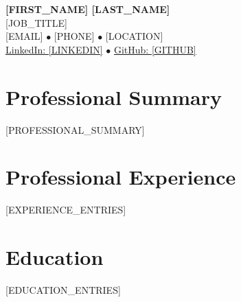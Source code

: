 \documentclass[10pt,letterpaper]{article}
\makeatletter
\newcommand{\ressubheading}[4]{
    \begin{tabular*}{6.5in}{l@{\cftdotfill{\cftsecdotsep}\extracolsep{\fill}}r}
        \textbf{#1} & #2 \\
        \textit{#3} & \textit{#4} \\
    \end{tabular*}\vspace{-6pt}
}
\newcommand{\resitem}[1]{\item #1 \vspace{-2pt}}
\newcommand{\resliststart}{\begin{itemize}[leftmargin=*,noitemsep,topsep=0pt]}
\newcommand{\reslistend}{\end{itemize}}
\makeatother
\begin{document}
\begin{center}
    {\Huge\bfseries\color{heading}[FIRST_NAME] [LAST_NAME]}\\
    \vspace{5pt}
    {\Large\color{subheading}[JOB_TITLE]}\\
    \vspace{8pt}
    [EMAIL] $\bullet$ [PHONE] $\bullet$ [LOCATION]\\
    \href{https://linkedin.com/in/[LINKEDIN]}{LinkedIn: [LINKEDIN]} $\bullet$ 
    \href{https://github.com/[GITHUB]}{GitHub: [GITHUB]}
\end{center}

\vspace{10pt}

\section{Professional Summary}
[PROFESSIONAL_SUMMARY]

\section{Professional Experience}
[EXPERIENCE_ENTRIES]

\section{Education}
[EDUCATION_ENTRIES]

\end{document}
